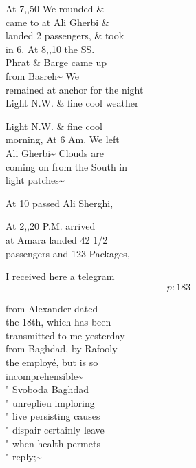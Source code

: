 \documentclass{report}
\begin{document}
	\par{
 	At 7,,50 We rounded \&\ \\came to at Ali Gherbi \&\ \\landed 2 passengers, \& took\ \\in 6. At 8,,10 the SS.\ \\Phrat \& Barge came up\ \\from Basreh\~{} We\ \\remained at anchor for the night\ \\Light N.W. \& fine cool weather\ \\
	}

	\par{
 	Light N.W. \& fine cool\ \\morning, At 6 Am. We left\ \\Ali Gherbi\~{} Clouds are\ \\coming on from the South in\ \\light patches\~{}\ \\
	}

	\par{
 	At 10 passed Ali Sherghi,\ \\
	}

	\par{
 	At 2,,20 P.M. arrived\ \\at Amara landed 42 1/2\ \\passengers and 123 Packages,\ \\
	}

	\par{
 	I received here a telegram\ \\
  \[p: 183 \]

	}


	\par{
 	from Alexander dated\ \\the 18th, which has been\ \\transmitted to me yesterday\ \\from Baghdad, by Rafooly\ \\the employé, but is so\ \\incomprehensible\~{}\ \\" Svoboda Baghdad\ \\" unreplieu imploring\ \\" live persisting causes\ \\" dispair certainly leave\ \\" when health permets\ \\" reply;\~{}\ \\
	}
\end{document}

